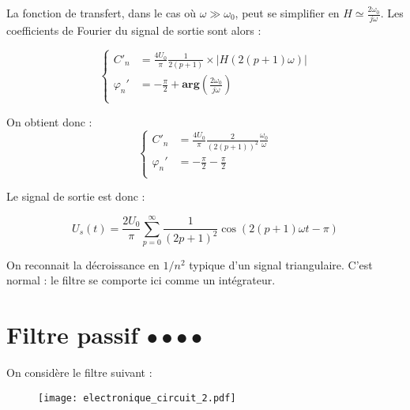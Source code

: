 \begin{correction}
\begin{enumerate}
La fonction de transfert, dans le cas où $\omega\gg\omega_0$, peut se simplifier en $H\simeq\frac{2\omega_0}{j\omega}$. Les coefficients de Fourier du signal de sortie sont alors : 

\begin{equation}
	\left\lbrace
	\begin{array}{lll}
		C'_n & = \frac{4U_0}{\pi}\frac{1}{2(p+1)}\times |H(2(p+1)\omega)|\\

		\varphi_n' &= -\frac{\pi}{2}+\mathbf{arg}\left(\frac{2\omega_0}{j\omega} \right)  \\
	\end{array}\right.
\end{equation}

On obtient donc :
\begin{equation}
	\left\lbrace
	\begin{array}{lll}
		C'_n & = \frac{4U_0}{\pi}\frac{2}{(2(p+1))^2}\frac{\omega_0}{\omega}\\
		\varphi_n' &= -\frac{\pi}{2}-\frac{\pi}{2} \\
	\end{array}\right.
\end{equation}

Le signal de sortie est donc :

\begin{equation}
	U_s(t) = \frac{2U_0}{\pi}\sum_{p=0}^{\infty}\frac{1}{(2p+1)^2}\cos(2(p+1)\omega t -\pi)
\end{equation}

On reconnait la décroissance en $1/n^2$ typique d'un signal triangulaire. C'est normal : le filtre se comporte ici comme un intégrateur.

\end{enumerate}

\end{correction}

\newpage

\section{Filtre passif $\bullet\bullet\bullet\bullet$}

On considère le filtre suivant :

\begin{figure}[!h]
\centering
\texttt{[image: electronique\_circuit\_2.pdf]}
\end{figure}

